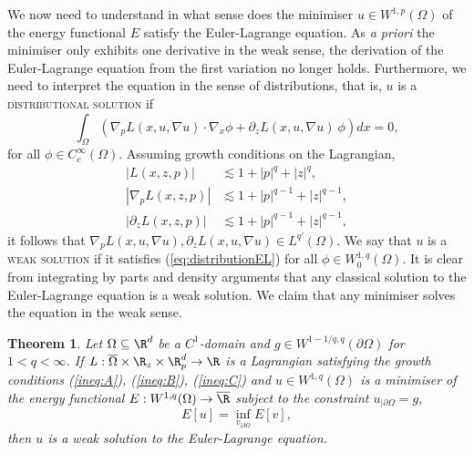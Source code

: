 \documentclass[reqno]{amsart}
\newtheorem{theorem}{Theorem}
\theoremstyle{definition}
\theoremstyle{remark}
\renewcommand{\emph}{\textsc}
\begin{document}
We now need to understand in what sense does the minimiser $u \in W^{1 ,p} (\Omega)$ of the energy functional $E$ satisfy the Euler-Lagrange equation. As \textit{a priori} the minimiser only exhibits one derivative in the weak sense, the derivation of the Euler-Lagrange equation from the first variation no longer holds. Furthermore, we need to interpret the equation in the sense of distributions, that is, $u$ is a \emph{distributional solution} if
	\begin{equation}
		 \int_\Omega \left(\nabla_p L (x, u, \nabla u) \cdot \nabla_x \phi + \partial_z L (x, u, \nabla u) \ \phi\right) dx = 0, \tag{*} \label{eq:distributionEL}
	\end{equation}	 
for all $\phi \in C^\infty_c (\Omega)$. Assuming growth conditions on the Lagrangian, 
	\begin{align}
		|L(x, z, p)| 
			&\lesssim 1 + |p|^q + |z|^q, \tag{$A$} \label{ineq:A} \\
		|\nabla_p L(x, z, p)|
			&\lesssim 1 + |p|^{q - 1} + |z|^{q - 1}, \tag{$B$} \label{ineq:B}\\
		|\partial_z L(x, z, p)|
			&\lesssim 1 + |p|^{q - 1} + |z|^{q - 1} \tag{$C$} \label{ineq:C} ,	
	\end{align}
it follows that $\nabla_p L(x, u, \nabla u), \partial_z L(x, u, \nabla u) \in L^{q'} (\Omega)$. We say that $u$ is a \emph{weak solution} if it satisfies (\ref{eq:distributionEL}) for all $\phi \in W^{1, q}_0 (\Omega)$. It is clear from integrating by parts and density arguments that any classical solution to the Euler-Lagrange equation is a weak solution. We claim that any minimiser solves the equation in the weak sense. 

\begin{theorem}
	Let $\Omega \subseteq \R^d$ be a $C^1$-domain and $g \in W^{1 - 1/q, q} (\partial \Omega)$ for $1 < q < \infty$. If $L : \overline \Omega \times \R_z \times \R_p^d \to \R$ is a Lagrangian satisfying the growth conditions (\ref{ineq:A}), (\ref{ineq:B}), (\ref{ineq:C}) and $u \in W^{1, q} (\Omega)$ is a minimiser of the energy functional $E: W^{1, q} (\Omega) \to \overline \R$ subject to the constraint $u_{|\partial \Omega} = g$,
		\[ E[u] = \inf_{v_{|\partial \Omega}} E[v], \]
	then $u$ is a weak solution to the Euler-Lagrange equation.	
\end{theorem}
\end{document}
